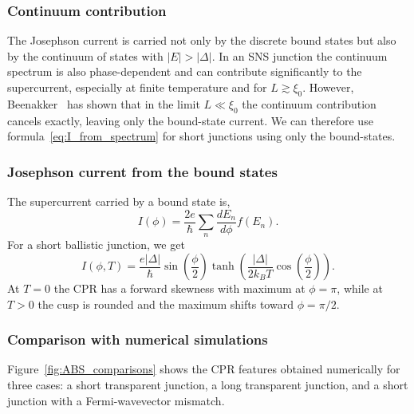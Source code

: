 \documentclass[11pt,a4paper,twoside,openany]{report}
\begin{document}
\subsubsection{Continuum contribution}

The Josephson current is carried not only by the discrete bound states but also by the continuum of states with $|E|>|\Delta|$.  In an SNS junction the continuum spectrum is also phase-dependent and can contribute significantly to the supercurrent, especially at finite temperature and for $L \gtrsim \xi_0$.  However, Beenakker~\cite{beenaker_1992} has shown that in the limit $L \ll \xi_0$ the continuum contribution cancels exactly, leaving only the bound-state current. We can therefore use formula~\eqref{eq:I_from_spectrum} for short junctions using only the bound-states.

\subsubsection{Josephson current from the bound states}

The supercurrent carried by a bound state is, 
\begin{equation}
  I(\phi) = \frac{2e}{\hbar} \sum_{n} \frac{d E_n}{d\phi} f(E_n) .
  \label{eq:current_ABS_general}
\end{equation}
For a short ballistic junction, we get
\begin{equation}
  \boxed{
  I(\phi,T) = \frac{e|\Delta|}{\hbar} \sin\!\left(\frac{\phi}{2}\right)
              \tanh\!\left( \frac{|\Delta|}{2k_B T} \cos\!\left(\frac{\phi}{2}\right) \right) .
  }
  \label{eq:CPR_KO_T}
\end{equation}
At $T=0$ the CPR has a forward skewness with maximum at $\phi=\pi$, while at $T>0$ the cusp is rounded and the maximum shifts toward $\phi=\pi/2$.

\subsubsection{Comparison with numerical simulations}

Figure~\ref{fig:ABS_comparisons} shows the CPR features obtained numerically for three cases: a short transparent junction, a long transparent junction, and a short junction with a Fermi-wavevector mismatch.
\end{document}
